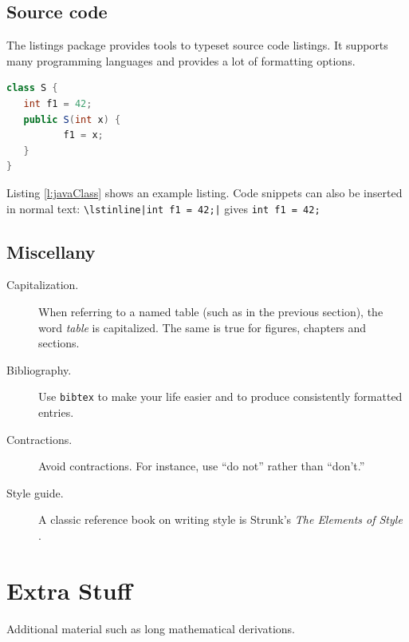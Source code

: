 \documentclass[11pt,a4paper]{book}
\begin{document}
\section{Source code}

The listings package provides tools to typeset source code
listings. It supports many programming languages and provides a lot of
formatting options.

\lstset{numbers=left, numberstyle=\tiny, stepnumber=1, numbersep=5pt}
\lstset{basicstyle=\ttfamily}
\lstset{frame=tb}

\begin{lstlisting}[float,caption=Example usage of the listing package,label=l:javaClass,language=Java]
class S {
   int f1 = 42;
   public S(int x) {
          f1 = x;
   }
}
\end{lstlisting}

Listing \ref{l:javaClass} shows an example listing. Code snippets can
also be inserted in normal text:
\verb$\lstinline|int f1 = 42;|$ gives \lstinline$int f1 = 42;$

\section{Miscellany}

\begin{description}

\item[Capitalization.] When referring to a named table (such as in the
  previous section), the word \emph{table} is capitalized. The same is
  true for figures, chapters and sections.

\item[Bibliography.] Use \verb|bibtex| to make your life easier and to
  produce consistently formatted entries.

\item[Contractions.] Avoid contractions. For instance, use ``do not''
  rather than ``don't.''

\item[Style guide.] A classic reference book on writing style is
  Strunk's \emph{The Elements of Style} \cite{Strunk-ElementsOfStyle}.

\end{description}

\appendix
\chapter{Extra Stuff}
\label{s:ExtraStuff}

Additional material such as long mathematical derivations.




\end{document}
